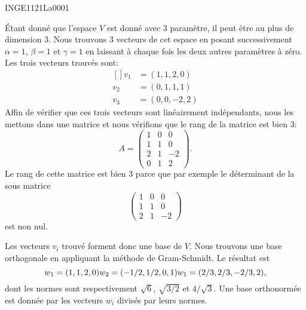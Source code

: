 

\begin{corrige}{INGE1121La0001}

	Étant donné que l'espace $V$ est donné avec $3$ paramètre, il peut être au plus de dimension $3$. Nous trouvons $3$ vecteurs de cet espace en posant successivement $\alpha=1$, $\beta=1$ et $\gamma=1$ en laissant à chaque fois les deux autres paramètres à zéro. Les trois vecteurs trouvés sont:
	\begin{equation}
		\begin{aligned}[]
			v_1&=(1,1,2,0)\\
			v_2&=(0,1,1,1)\\
			v_3&=(0,0,-2,2)
		\end{aligned}
	\end{equation}
	Affin de vérifier que ces trois vecteurs sont linéairement indépendants, nous les mettons dans une matrice et nous vérifions que le rang de la matrice est bien $3$:
	\begin{equation}
		A=\begin{pmatrix}
			1	&	0	&	0	\\
			1	&	1	&	0	\\
			2	&	1	&	-2	\\
			0	&	1	&	2
		\end{pmatrix}.
	\end{equation}
	Le rang de cette matrice est bien $3$ parce que par exemple le déterminant de la sous matrice
	\begin{equation}
		\begin{pmatrix}
			1	&	0	&	0	\\
			1	&	1	&	0	\\
			2	&	1	&	-2
		\end{pmatrix}
	\end{equation}
	est non nul.

	Les vecteurs $v_i$ trouvé forment donc une base de $V$. Nous trouvons une base orthogonale en appliquant la méthode de Gram-Schmidt. Le résultat est
	\begin{equation}
		w_1=(1,1,2,0)\\
		w_2=(-1/2,1/2,0,1)\\
		w_1=(2/3,2/3,-2/3,2),
	\end{equation}
	dont les normes sont respectivement $\sqrt{6}$, $\sqrt{3/2}$ et $4/\sqrt{3}$. Une base orthonormée est donnée par les vecteurs $w_i$ divisés par leurs normes.

\end{corrige}
